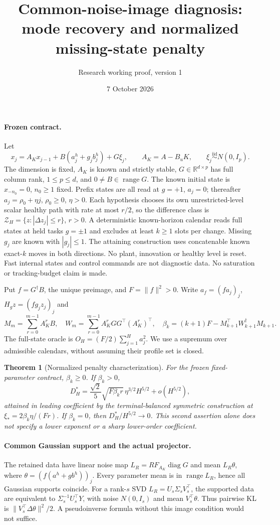 \documentclass[11pt]{article}
\title{Common-noise-image diagnosis:\\mode recovery and normalized missing-state penalty}
\author{Research working proof, version 1}
\date{7 October 2026}
\newtheorem{theorem}{Theorem}
\begin{document}
\maketitle
\paragraph{Frozen contract.}
Let
\[
x_j=A_Kx_{j-1}+B(a_j^h+g_jb_j^h)+G\xi_j,\qquad
A_K=A-B_uK,\qquad \xi_j\overset{\mathrm{iid}}{\sim}N(0,I_p).
\]
The dimension is fixed, $A_K$ is known and strictly stable,
$G\in\mathbb R^{d\times p}$ has full column rank, $1\le p\le d$,
and $0\ne B\in\operatorname{range}G$.
The known initial state is $x_{-n_0}=0$, $n_0\ge1$ fixed.
Prefix states are all read at $g=+1$, $a_j=0$; thereafter
$a_j=\rho_0+\eta j$, $\rho_0\ge0$, $\eta>0$.
Each hypothesis chooses its own unrestricted-level scalar healthy path
with rate at most $r/2$, so the difference class is
$\mathcal Z_H=\{z:|\Delta z_j|\le r\}$, $r>0$.
A deterministic known-horizon calendar reads full states at held tasks
$g=\pm1$ and excludes at least $k\ge1$ slots per change.
Missing $g_j$ are known with $|g_j|\le1$.
The attaining construction uses concatenable known exact-$k$ moves
in both directions. No plant, innovation or healthy level is reset.
Fast internal states and control commands are not diagnostic data.
No saturation or tracking-budget claim is made.

Put $f=G^\dagger B$, the unique preimage, and $F=\|f\|^2>0$.
Write $a_f=(f a_j)_j$, $H_gz=(f g_jz_j)_j$ and
\[
M_m=\sum_{r=0}^{m-1}A_K^rB,\quad
W_m=\sum_{r=0}^{m-1}A_K^rGG^\top(A_K^r)^\top,\quad
\beta_k=(k+1)F-M_{k+1}^\top W_{k+1}^\dagger M_{k+1}.
\]
The full-state oracle is $O_H=(F/2)\sum_{j=1}^H a_j^2$.
We use a supremum over admissible calendars, without assuming their
profile set is closed.

\begin{theorem}[Normalized penalty characterization]\label{thm:m2s}
For the frozen fixed-parameter contract, $\beta_k\ge0$.
If $\beta_k>0$,
\[
D_H^*=\frac{\sqrt2}{5}\sqrt{F\beta_kr}\,\eta^{3/2}H^{5/2}
+o(H^{5/2}),
\]
attained in leading coefficient by the terminal-balanced symmetric
construction at $\xi_*=2\beta_k\eta/(Fr)$.
If $\beta_k=0$, then $D_H^*/H^{5/2}\to0$.
This second assertion alone does not specify a lower exponent or a
sharp lower-order coefficient.
\end{theorem}

\paragraph{Common Gaussian support and the actual projector.}
The retained data have linear noise map
$L_R=RF_{A_K}\operatorname{diag}G$ and mean $L_R\theta$,
where $\theta=(f(a^h+gb^h))_j$.
Every parameter mean is in $\operatorname{range}L_R$, hence all Gaussian
supports coincide.
For a rank-$s$ SVD $L_R=U_s\Sigma_sV_s^\top$, the supported data are
equivalent to $\Sigma_s^{-1}U_s^\top Y$, with noise $N(0,I_s)$ and
mean $V_s^\top\theta$.
Thus pairwise KL is $\|V_s^\top\Delta\theta\|^2/2$.
A pseudoinverse formula without this image condition would not suffice.
\end{document}

